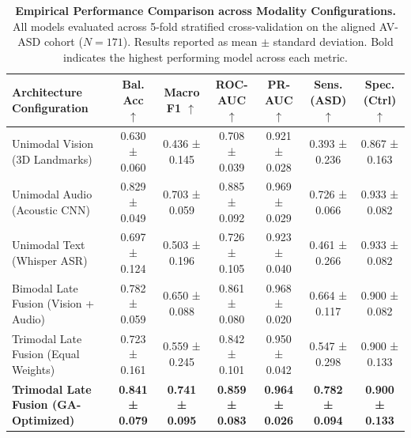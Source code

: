 \begin{table}[t]
\centering
\caption{\textbf{Empirical Performance Comparison across Modality Configurations.} All models evaluated across 5-fold stratified cross-validation on the aligned AV-ASD cohort ($N=171$). Results reported as mean $\pm$ standard deviation. Bold indicates the highest performing model across each metric.}
\label{tab:model_benchmark}
\small
\begin{tabular}{lcccccc}
\toprule
\textbf{Architecture Configuration} & \textbf{Bal. Acc $\uparrow$} & \textbf{Macro F1 $\uparrow$} & \textbf{ROC-AUC $\uparrow$} & \textbf{PR-AUC $\uparrow$} & \textbf{Sens. (ASD) $\uparrow$} & \textbf{Spec. (Ctrl) $\uparrow$} \\
\midrule
Unimodal Vision (3D Landmarks) & 0.630 ± 0.060 & 0.436 ± 0.145 & 0.708 ± 0.039 & 0.921 ± 0.028 & 0.393 ± 0.236 & 0.867 ± 0.163 \\
Unimodal Audio (Acoustic CNN) & 0.829 ± 0.049 & 0.703 ± 0.059 & 0.885 ± 0.092 & 0.969 ± 0.029 & 0.726 ± 0.066 & 0.933 ± 0.082 \\
Unimodal Text (Whisper ASR) & 0.697 ± 0.124 & 0.503 ± 0.196 & 0.726 ± 0.105 & 0.923 ± 0.040 & 0.461 ± 0.266 & 0.933 ± 0.082 \\
Bimodal Late Fusion (Vision + Audio) & 0.782 ± 0.059 & 0.650 ± 0.088 & 0.861 ± 0.080 & 0.968 ± 0.020 & 0.664 ± 0.117 & 0.900 ± 0.082 \\
Trimodal Late Fusion (Equal Weights) & 0.723 ± 0.161 & 0.559 ± 0.245 & 0.842 ± 0.101 & 0.950 ± 0.042 & 0.547 ± 0.298 & 0.900 ± 0.133 \\
\textbf{Trimodal Late Fusion (GA-Optimized)} & \textbf{0.841 ± 0.079} & \textbf{0.741 ± 0.095} & \textbf{0.859 ± 0.083} & \textbf{0.964 ± 0.026} & \textbf{0.782 ± 0.094} & \textbf{0.900 ± 0.133} \\
\bottomrule
\end{tabular}
\end{table}
